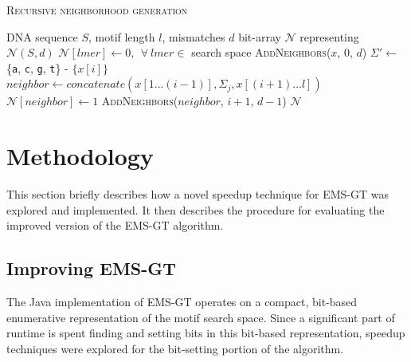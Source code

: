 \documentclass[oneside,12pt]{DISCSthesis}
\begin{document}
{		{
			\noindent \hspace*{6pt}{\bf Algorithm 2.3} \textsc{Recursive neighborhood generation}\small
			\begin{algorithmic}[1]
				\label{alg:recursive-nbr-gen}
				\Require DNA sequence $S$, motif length $l$, mismatches $d$
				\Ensure bit-array $\mathcal{N}$ representing $\mathcal{N}(S,d)$ \vspace*{6pt}
				\State $\mathcal{N}[lmer] \leftarrow 0,\ \ \forall\ lmer \in $ search space 
				\State \textsc{AddNeighbors}($x$, 0, $d$) \hspace*{79pt}
				\EndFor
				\newline
				\State {}
						\State $\Sigma' \leftarrow$ \{\texttt{a}, \texttt{c}, \texttt{g}, \texttt{t}\} - $\{x[i]\}$ \hspace*{79pt}
							\State $neighbor \leftarrow concatenate(x[1...(i-1)],\Sigma_{j},x[(i+1)...l])$
							\State $\mathcal{N}[neighbor] \leftarrow 1$				\hspace*{100pt}
								\State \textsc{AddNeighbors}($neighbor$, $i+1$, $d-1$)
							\EndIf
						\EndFor
					\EndFor
				\EndProcedure
				\State\Return $\mathcal{N}$
				\end{algorithmic}
			}

\chapter{Methodology}
	This section briefly describes how a novel speedup technique for EMS-GT was explored and implemented.
	It then describes the procedure for evaluating the improved version of the EMS-GT algorithm.

	\section{Improving EMS-GT}
		The Java implementation of EMS-GT operates on a compact, bit-based enumerative representation of the motif search space. Since a significant part of runtime is spent finding and setting bits in this bit-based representation, speedup techniques were explored for the bit-setting portion of the algorithm.

}
\end{document}
